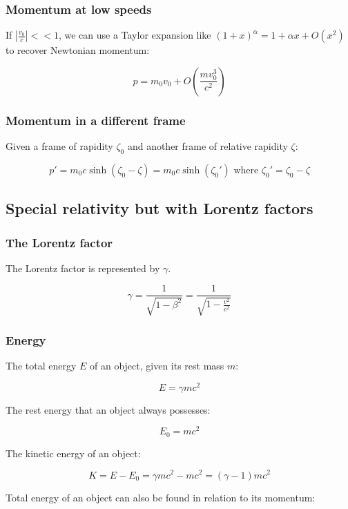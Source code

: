 \documentclass[12pt]{article}
\begin{document}
\subsubsection{Momentum at low speeds}

If $\left|\frac{v_0}{c}\right| << 1$, we can use a Taylor expansion like $(1 + x)^\alpha = 1 + \alpha x + O(x^2)$ to recover Newtonian momentum:

\[
\boxed{
p = m_0v_0 + O\left(\frac{mv_0^3}{c^2}\right)
}
\]

\subsubsection{Momentum in a different frame}

Given a frame of rapidity $\zeta_0$ and another frame of relative rapidity $\zeta$:

\[
\boxed{
p' = m_0 c \sinh(\zeta_0 - \zeta) = m_0 c \sinh(\zeta_0')}\text{ where } \zeta_0' = \zeta_0 - \zeta
\]

\newpage

\subsection{Special relativity but with Lorentz factors}

\subsubsection{The Lorentz factor}

The Lorentz factor is represented by $\gamma$.

\[
\boxed{
\gamma = \frac{1}{\sqrt{1 - \beta^2}} = \frac{1}{\sqrt{1 - \frac{v^2}{c^2}}}
}
\]

\subsubsection{Energy}

The total energy $E$ of an object, given its rest mass $m$:

\[
\boxed{
E = \gamma mc^2
}
\]

The rest energy that an object always possesses:

\[
\boxed{
E_0 = mc^2
}
\]

The kinetic energy of an object:

\[
\boxed{
K = E - E_0 = \gamma mc^2 - mc^2 = (\gamma - 1)mc^2
}
\]

Total energy of an object can also be found in relation to its momentum:
\end{document}

